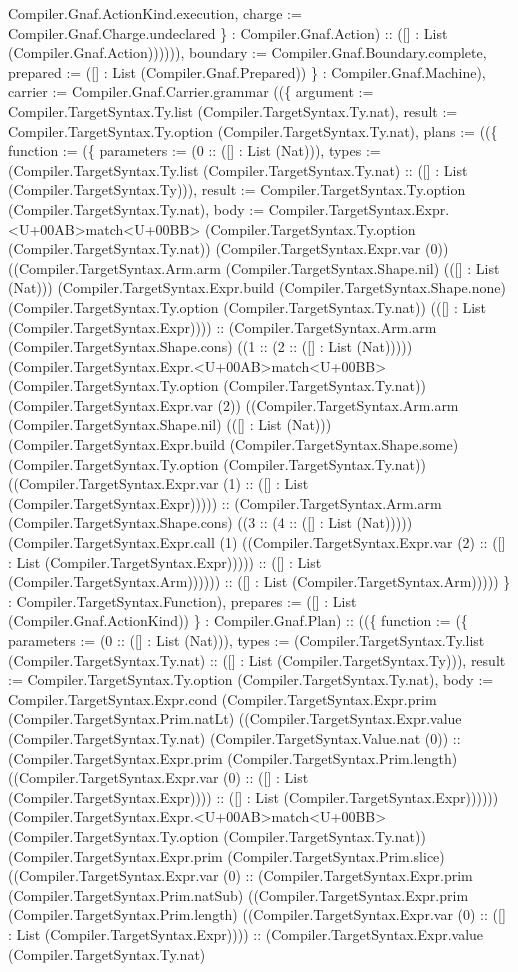 \documentclass[11pt]{article}
\begin{document}
Compiler.Gnaf.ActionKind.execution, charge := Compiler.Gnaf.Charge.undeclared \} : Compiler.Gnaf.Action) :: ([] : List (Compiler.Gnaf.Action)))))), boundary := Compiler.Gnaf.Boundary.complete, prepared := ([] : List (Compiler.Gnaf.Prepared)) \} : Compiler.Gnaf.Machine), carrier := Compiler.Gnaf.Carrier.grammar ((\{ argument := Compiler.TargetSyntax.Ty.list (Compiler.TargetSyntax.Ty.nat), result := Compiler.TargetSyntax.Ty.option (Compiler.TargetSyntax.Ty.nat), plans := ((\{ function := (\{ parameters := (0 :: ([] : List (Nat))), types := (Compiler.TargetSyntax.Ty.list (Compiler.TargetSyntax.Ty.nat) :: ([] : List (Compiler.TargetSyntax.Ty))), result := Compiler.TargetSyntax.Ty.option (Compiler.TargetSyntax.Ty.nat), body := Compiler.TargetSyntax.Expr.<U+00AB>match<U+00BB> (Compiler.TargetSyntax.Ty.option (Compiler.TargetSyntax.Ty.nat)) (Compiler.TargetSyntax.Expr.var (0)) ((Compiler.TargetSyntax.Arm.arm (Compiler.TargetSyntax.Shape.nil) (([] : List (Nat))) (Compiler.TargetSyntax.Expr.build (Compiler.TargetSyntax.Shape.none) (Compiler.TargetSyntax.Ty.option (Compiler.TargetSyntax.Ty.nat)) (([] : List (Compiler.TargetSyntax.Expr)))) :: (Compiler.TargetSyntax.Arm.arm (Compiler.TargetSyntax.Shape.cons) ((1 :: (2 :: ([] : List (Nat))))) (Compiler.TargetSyntax.Expr.<U+00AB>match<U+00BB> (Compiler.TargetSyntax.Ty.option (Compiler.TargetSyntax.Ty.nat)) (Compiler.TargetSyntax.Expr.var (2)) ((Compiler.TargetSyntax.Arm.arm (Compiler.TargetSyntax.Shape.nil) (([] : List (Nat))) (Compiler.TargetSyntax.Expr.build (Compiler.TargetSyntax.Shape.some) (Compiler.TargetSyntax.Ty.option (Compiler.TargetSyntax.Ty.nat)) ((Compiler.TargetSyntax.Expr.var (1) :: ([] : List (Compiler.TargetSyntax.Expr))))) :: (Compiler.TargetSyntax.Arm.arm (Compiler.TargetSyntax.Shape.cons) ((3 :: (4 :: ([] : List (Nat))))) (Compiler.TargetSyntax.Expr.call (1) ((Compiler.TargetSyntax.Expr.var (2) :: ([] : List (Compiler.TargetSyntax.Expr))))) :: ([] : List (Compiler.TargetSyntax.Arm)))))) :: ([] : List (Compiler.TargetSyntax.Arm))))) \} : Compiler.TargetSyntax.Function), prepares := ([] : List (Compiler.Gnaf.ActionKind)) \} : Compiler.Gnaf.Plan) :: ((\{ function := (\{ parameters := (0 :: ([] : List (Nat))), types := (Compiler.TargetSyntax.Ty.list (Compiler.TargetSyntax.Ty.nat) :: ([] : List (Compiler.TargetSyntax.Ty))), result := Compiler.TargetSyntax.Ty.option (Compiler.TargetSyntax.Ty.nat), body := Compiler.TargetSyntax.Expr.cond (Compiler.TargetSyntax.Expr.prim (Compiler.TargetSyntax.Prim.natLt) ((Compiler.TargetSyntax.Expr.value (Compiler.TargetSyntax.Ty.nat) (Compiler.TargetSyntax.Value.nat (0)) :: (Compiler.TargetSyntax.Expr.prim (Compiler.TargetSyntax.Prim.length) ((Compiler.TargetSyntax.Expr.var (0) :: ([] : List (Compiler.TargetSyntax.Expr)))) :: ([] : List (Compiler.TargetSyntax.Expr)))))) (Compiler.TargetSyntax.Expr.<U+00AB>match<U+00BB> (Compiler.TargetSyntax.Ty.option (Compiler.TargetSyntax.Ty.nat)) (Compiler.TargetSyntax.Expr.prim (Compiler.TargetSyntax.Prim.slice) ((Compiler.TargetSyntax.Expr.var (0) :: (Compiler.TargetSyntax.Expr.prim (Compiler.TargetSyntax.Prim.natSub) ((Compiler.TargetSyntax.Expr.prim (Compiler.TargetSyntax.Prim.length) ((Compiler.TargetSyntax.Expr.var (0) :: ([] : List (Compiler.TargetSyntax.Expr)))) :: (Compiler.TargetSyntax.Expr.value (Compiler.TargetSyntax.Ty.nat) 
\end{document}
